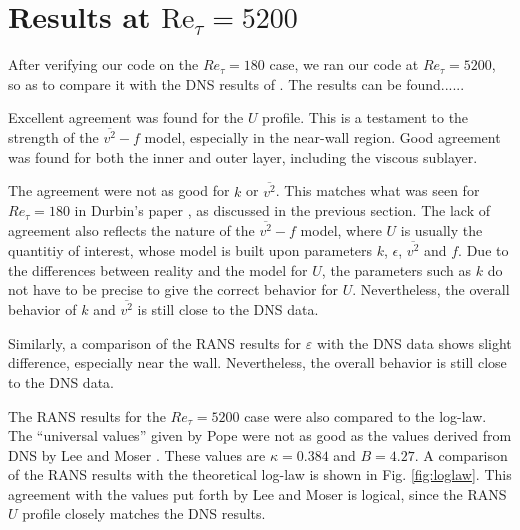 \documentclass[a4paper,11pt]{article}
\begin{document}
\section{Results at $\mathrm{Re}_{\tau} = 5200$}
After verifying our code on the $Re_{\tau} = 180$ case, we ran our code at $Re_{\tau} = 5200$, so as to compare it with the DNS results of \cite{Lee}. The results can be found......

Excellent agreement was found for the $U$ profile.  This is a testament to the strength of the $\overline{v^2}-f$ model, especially in the near-wall region.  Good agreement was found for both the inner and outer layer, including the viscous sublayer.

The agreement were not as good for $k$ or $\overline{v^2}$.  This matches what was seen for $Re_{\tau} = 180$ in Durbin's paper \cite{durbin180}, as discussed in the previous section.  The lack of agreement also reflects the nature of the $\overline{v^2}-f$ model, where $U$ is usually the quantitiy of interest, whose model is built upon parameters $k$, $\epsilon$, $\overline{v^2}$ and $f$.  Due to the differences between reality and the model for $U$, the parameters such as $k$ do not have to be precise to give the correct behavior for $U$. Nevertheless, the overall behavior of $k$ and $\overline{v^2}$ is still close to the DNS data.

Similarly, a comparison of the RANS results for $\varepsilon$ with the DNS data shows slight difference, especially near the wall. Nevertheless, the overall behavior is still close to the DNS data.

The RANS results for the $Re_{\tau} = 5200$ case were also compared to the log-law.  The ``universal values'' given by Pope \cite{pope} were not as good as the values derived from DNS by Lee and Moser \cite{Lee}.  These values are $\kappa = 0.384$ and $B = 4.27$.  A comparison of the RANS results with the theoretical log-law is shown in Fig. \ref{fig:loglaw}. This agreement with the values put forth by Lee and Moser is logical, since the RANS $U$ profile closely matches the DNS results.
\end{document}
